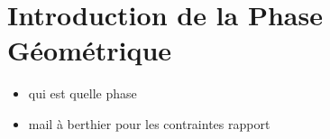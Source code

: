 \newpage

\tableofcontents
\thispagestyle{empty}







\part{Introduction de la Phase Géométrique} \label{part:param_instant} 








	
	


	



\newpage
\begin{itemize}
	\item qui est quelle phase
	\item mail à berthier pour les contraintes rapport
\end{itemize}
	
	
	

\newpage

\listoffigures
\vfill
\lstlistoflistings
\vfill

\newpage

{}



